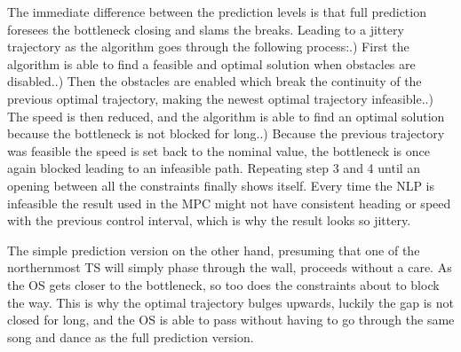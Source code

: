 The immediate difference between the prediction levels is that full prediction foresees the bottleneck closing and slams the breaks.
Leading to a jittery trajectory as the algorithm goes through the following process:.) First the algorithm is able to find a feasible and optimal solution when obstacles are disabled..) Then the obstacles are enabled which break the continuity of the previous optimal trajectory, making the newest optimal trajectory infeasible..) The speed is then reduced, and the algorithm is able to find an optimal solution because the bottleneck is not blocked for long..) Because the previous trajectory was feasible the speed is set back to the nominal value, the bottleneck is once again blocked leading to an infeasible path.\newline
Repeating step 3 and 4 until an opening between all the constraints finally shows itself. Every time the \gls{NLP} is infeasible the result used in the MPC
might not have consistent heading or speed with the previous control interval, which is why the result looks so jittery.

The simple prediction version on the other hand, presuming that one of the northernmost TS will simply phase through the wall, proceeds without a care.
As the \gls{OS} gets closer to the bottleneck, so too does the constraints about to block the way. This is why the optimal trajectory bulges upwards, luckily the gap is not
closed for long, and the OS is able to pass without having to go through the same song and dance as the full prediction version.


